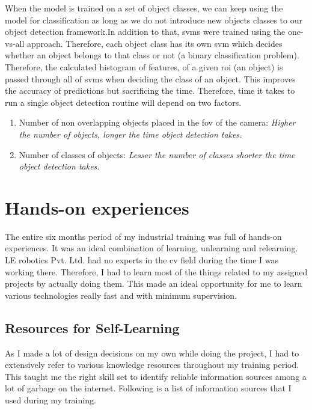 \documentclass[a4paper,12pt]{report}%
\begin{document}
When the model is trained on a set of object classes, we can keep using the model for classification as long as we do not introduce new objects classes to our object detection framework.In addition to that, \ac{svm}s were trained using the one-vs-all approach. Therefore, each object class has its own \ac{svm} which decides whether an object belongs to that class or not (a binary classification problem). Therefore, the calculated histogram of features, of a given \ac{roi} (an object) is passed through all of \ac{svm}s when deciding the class of an object. This improves the accuracy of predictions but sacrificing the time. Therefore, time it takes to run a single object detection routine will depend on two factors.

\begin{enumerate}
	\item Number of non overlapping objects placed in the \ac{fov} of the camera: \textit{Higher the number of objects, longer the time object detection takes.}
	
	\item Number of classes of objects: \textit{Lesser the number of classes  shorter the time object detection takes.}
\end{enumerate}



\chapter{Hands-on experiences}

The entire six months period of my industrial training was full of hands-on experiences. It was an ideal combination of learning, unlearning and relearning. LE robotics Pvt. Ltd. had no experts in the \ac{cv} field during the time I was working there. Therefore, I had to learn most of the things related to my assigned projects by actually doing them. This made an ideal opportunity for me to learn various technologies really fast and with minimum supervision. 

\section{Resources for Self-Learning}

As I made a lot of design decisions on my own while doing the project, I had to extensively refer to various knowledge resources throughout my training period. This taught me the right skill set to identify reliable information sources among a lot of garbage on the internet. Following is a list of information sources that I used during my training.\\
\end{document}
